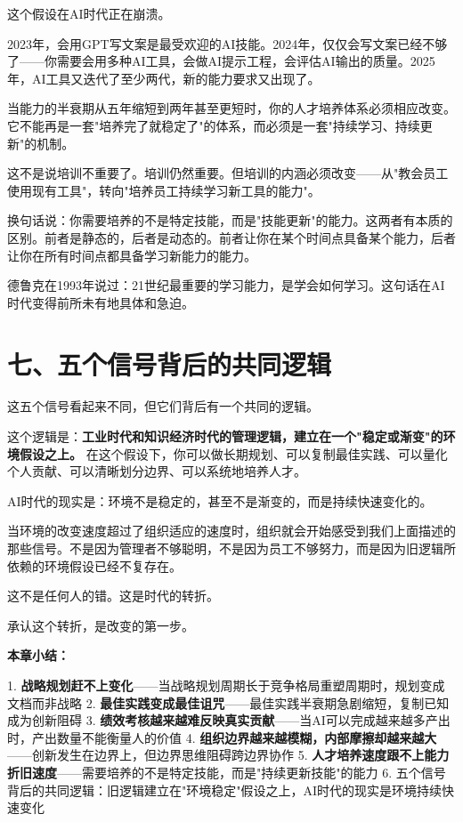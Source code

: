 这个假设在AI时代正在崩溃。

2023年，会用GPT写文案是最受欢迎的AI技能。2024年，仅仅会写文案已经不够了——你需要会用多种AI工具，会做AI提示工程，会评估AI输出的质量。2025年，AI工具又迭代了至少两代，新的能力要求又出现了。

当能力的半衰期从五年缩短到两年甚至更短时，你的人才培养体系必须相应改变。它不能再是一套"培养完了就稳定了"的体系，而必须是一套"持续学习、持续更新"的机制。

这不是说培训不重要了。培训仍然重要。但培训的内涵必须改变——从"教会员工使用现有工具"，转向"培养员工持续学习新工具的能力"。

换句话说：你需要培养的不是特定技能，而是"技能更新"的能力。这两者有本质的区别。前者是静态的，后者是动态的。前者让你在某个时间点具备某个能力，后者让你在所有时间点都具备学习新能力的能力。

德鲁克在1993年说过：21世纪最重要的学习能力，是学会如何学习。这句话在AI时代变得前所未有地具体和急迫。


\section{七、五个信号背后的共同逻辑}


这五个信号看起来不同，但它们背后有一个共同的逻辑。

这个逻辑是：\textbf{工业时代和知识经济时代的管理逻辑，建立在一个"稳定或渐变"的环境假设之上。} 在这个假设下，你可以做长期规划、可以复制最佳实践、可以量化个人贡献、可以清晰划分边界、可以系统地培养人才。

AI时代的现实是：环境不是稳定的，甚至不是渐变的，而是持续快速变化的。

当环境的改变速度超过了组织适应的速度时，组织就会开始感受到我们上面描述的那些信号。不是因为管理者不够聪明，不是因为员工不够努力，而是因为旧逻辑所依赖的环境假设已经不复存在。

这不是任何人的错。这是时代的转折。

承认这个转折，是改变的第一步。


\textbf{本章小结：}

1. \textbf{战略规划赶不上变化}——当战略规划周期长于竞争格局重塑周期时，规划变成文档而非战略
2. \textbf{最佳实践变成最佳诅咒}——最佳实践半衰期急剧缩短，复制已知成为创新阻碍
3. \textbf{绩效考核越来越难反映真实贡献}——当AI可以完成越来越多产出时，产出数量不能衡量人的价值
4. \textbf{组织边界越来越模糊，内部摩擦却越来越大}——创新发生在边界上，但边界思维阻碍跨边界协作
5. \textbf{人才培养速度跟不上能力折旧速度}——需要培养的不是特定技能，而是"持续更新技能"的能力
6. 五个信号背后的共同逻辑：旧逻辑建立在"环境稳定"假设之上，AI时代的现实是环境持续快速变化
